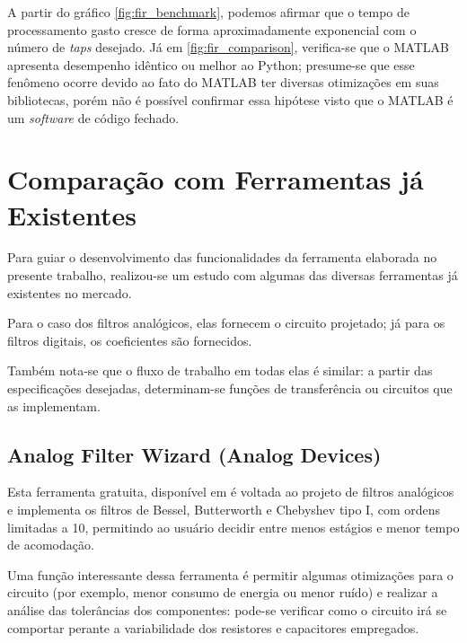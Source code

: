 A partir do gráfico \ref{fig:fir_benchmark}, podemos afirmar que o tempo de processamento gasto cresce de forma aproximadamente exponencial com o número de \textit{taps} desejado. Já em \ref{fig:fir_comparison}, verifica-se que o MATLAB apresenta desempenho idêntico ou melhor ao Python; presume-se que esse fenômeno ocorre devido ao fato do MATLAB ter diversas otimizações em suas bibliotecas, porém não é possível confirmar essa hipótese visto que o MATLAB é um \textit{software} de código fechado.

\section{Comparação com Ferramentas já Existentes}
\label{sec:tool_comparison}
Para guiar o desenvolvimento das funcionalidades da ferramenta elaborada no presente trabalho, realizou-se um estudo com algumas das diversas ferramentas já existentes no mercado. 

Para o caso dos filtros analógicos, elas fornecem o circuito projetado; já para os filtros digitais, os coeficientes são fornecidos.  

Também nota-se que o fluxo de trabalho em todas elas é similar: a partir das especificações desejadas, determinam-se funções de transferência ou circuitos que as implementam. 

\subsection{Analog Filter Wizard (Analog Devices)}
Esta ferramenta gratuita, disponível em \cite{analog} é voltada ao projeto de filtros analógicos e implementa os filtros de Bessel, Butterworth e Chebyshev tipo I, com ordens limitadas a 10, permitindo ao usuário decidir entre menos estágios e menor tempo de acomodação.

Uma função interessante dessa ferramenta é permitir algumas otimizações para o circuito (por exemplo, menor consumo de energia ou menor ruído) e realizar a análise das tolerâncias dos componentes: pode-se verificar como o circuito irá se comportar perante a variabilidade dos resistores e capacitores empregados.

